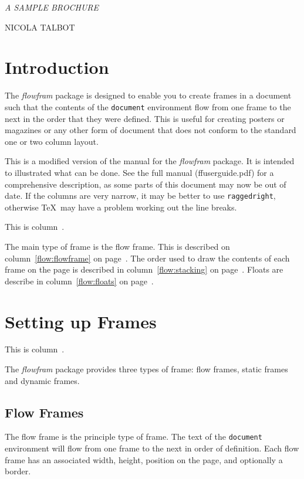 \documentclass[a4paper]{report}
\newcommand{\env}[1]{\texttt{#1}}
\newcommand{\cmdname}[1]{\texttt{\symbol{92}#1}}
\begin{document}
{\noindent
\slshape\Huge\MakeUppercase{A Sample Brochure}\par
\vskip0.5in
\noindent\large\MakeUppercase{Nicola Talbot}\\
}


\chapter{Introduction}

The \textsl{flowfram} package is designed to enable you to create
frames in a document such that the 
contents of the \env{document} environment flow from one 
frame to the next in the order that they were defined.  
This is useful for creating posters
or magazines or any other form of document that does not 
conform to the standard one or two column layout.

This is a modified version of the manual for the \textsl{flowfram} package.
It is intended to illustrated what can be done. See the full 
manual (ffuserguide.pdf) for
a comprehensive description, as some parts of this document
may now be out of date.
If the columns are very narrow, it may be better to
use \cmdname{raggedright}, otherwise \TeX\ may have a
problem working out the line breaks.

This is column~\thedisplayedframe.

The main type of frame is the flow frame. This is described on
column~\ref{flow:flowframe} on page~\pageref{flow:flowframe}.
The order used to draw the contents of each frame on the page
is described in column~\ref{flow:stacking} on 
page~\pageref{flow:stacking}. Floats are describe in 
column~\ref{flow:floats} on page~\pageref{flow:floats}.

\chapter{Setting up Frames}

This is column~\thedisplayedframe.

The \textsl{flowfram} package provides three types of frame:
{flow frames}, {static 
frames} and {dynamic frames}.

\section*{Flow Frames}

The flow frame is the principle type of frame.
The text of the \env{document} environment will flow from 
one frame to the next in order of definition. Each 
flow frame has an associated width, height, 
position on the page, and optionally a border.
\end{document}
